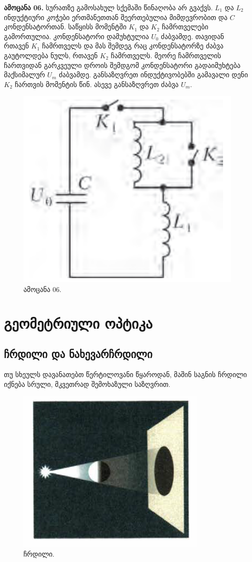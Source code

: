\documentclass{book}
\begin{document}
\textbf{ამოცანა 06.} სურათზე გამოსახულ სქემაში წინაღობა არ გვაქვს. $L_1$ და $L_2$ ინდუქტიური კოჭები ერთმანეთთან შეერთებულია მიმდევრობით და $C$ კონდენსატორთან. საწყისს მომენტში $K_1$ და $K_2$ ჩამრთველები გამორთულია. კონდენსატორი დამუხტულია $U_0$ ძაბვამდე. თავიდან რთავენ $K_1$ ჩამრთველს და მას შემდეგ რაც კონდენსატორზე ძაბვა გაუტოლდება ნულს, რთავენ $K_2$ ჩამრთველს. მეორე ჩამრთველის ჩართვიდან გარკვეული დროის შემდგომ კონდენსატორი გადაიმუხტება მაქსიმალურ $U_m$ ძაბვამდე. განსაზღვრეთ ინდუქტივობებში გამავალი დენი $K_2$ ჩართვის მომენტის წინ. ასევე განსაზღვრეთ ძაბვა $U_m$.  
	\begin{figure}[H]
		\centering
		\includegraphics[width=0.2\columnwidth]{figures/Screenshot 2022-11-12 002156}
		\caption{ამოცანა 06.}
	\end{figure}

\chapter{გეომეტრიული ოპტიკა}
\section{ჩრდილი და ნახევარჩრდილი} 
თუ სხეულს დავანათებთ წერტილოვანი წყაროდან, მაშინ საგნის ჩრდილი იქნება სრული, მკვეთრად შემოხაზული საზღვრით. 
		\begin{figure}[H]
		   \centering
           \includegraphics[width=0.3\columnwidth]{figures/shadow}
           \caption{ჩრდილი.}
           \label{fig:shadow}
        \end{figure}
        
\end{document}
